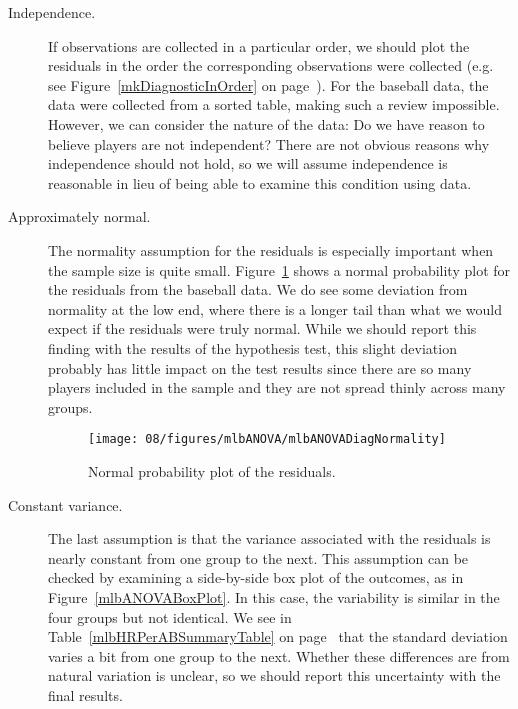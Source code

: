 \begin{description}
\item[Independence.] If observations are collected in a particular order, we should plot the residuals in the order the corresponding observations were collected (e.g. see Figure~\ref{mkDiagnosticInOrder} on page~\pageref{mkDiagnosticInOrder}). For the baseball data, the data were collected from a sorted table, making such a review impossible. However, we can consider the nature of the data: Do we have reason to believe players are not independent? There are not obvious reasons why independence should not hold, so we will assume independence is reasonable in lieu of being able to examine this condition using data.
\item[Approximately normal.] The normality assumption for the residuals is especially important when the sample size is quite small. Figure~\ref{mlbANOVADiagNormality} shows a normal probability plot for the residuals from the baseball data. We do see some deviation from normality at the low end, where there is a longer tail than what we would expect if the residuals were truly normal. While we should report this finding with the results of the hypothesis test, this slight deviation probably has little impact on the test results since there are so many players included in the sample and they are not spread thinly across many groups. %

\begin{figure}
\centering
\texttt{[image: 08/figures/mlbANOVA/mlbANOVADiagNormality]}
\caption{Normal probability plot of the residuals.}
\label{mlbANOVADiagNormality}
\end{figure}

\item[Constant variance.] The last assumption is that the variance associated with the residuals is nearly constant from one group to the next. This assumption can be checked by examining a side-by-side box plot of the outcomes, as in Figure~\ref{mlbANOVABoxPlot}. In this case, the variability is similar in the four groups but not identical. We see in Table~\ref{mlbHRPerABSummaryTable} on page~\pageref{mlbHRPerABSummaryTable} that the standard deviation varies a bit from one group to the next. Whether these differences are from natural variation is unclear, so we should report this uncertainty with the final results.
\end{description}

